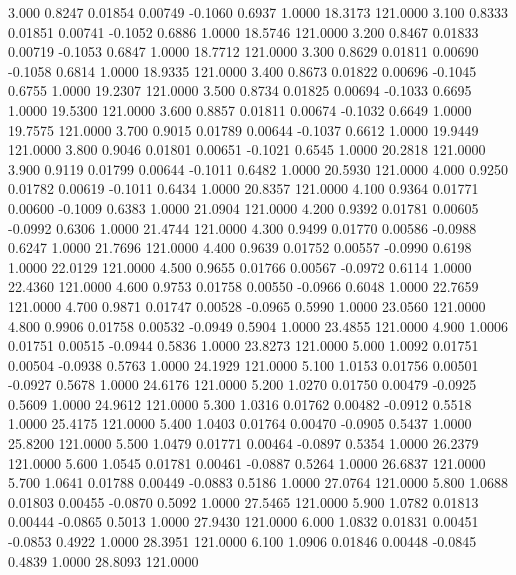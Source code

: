    3.000   0.8247   0.01854   0.00749  -0.1060   0.6937   1.0000  18.3173 121.0000
   3.100   0.8333   0.01851   0.00741  -0.1052   0.6886   1.0000  18.5746 121.0000
   3.200   0.8467   0.01833   0.00719  -0.1053   0.6847   1.0000  18.7712 121.0000
   3.300   0.8629   0.01811   0.00690  -0.1058   0.6814   1.0000  18.9335 121.0000
   3.400   0.8673   0.01822   0.00696  -0.1045   0.6755   1.0000  19.2307 121.0000
   3.500   0.8734   0.01825   0.00694  -0.1033   0.6695   1.0000  19.5300 121.0000
   3.600   0.8857   0.01811   0.00674  -0.1032   0.6649   1.0000  19.7575 121.0000
   3.700   0.9015   0.01789   0.00644  -0.1037   0.6612   1.0000  19.9449 121.0000
   3.800   0.9046   0.01801   0.00651  -0.1021   0.6545   1.0000  20.2818 121.0000
   3.900   0.9119   0.01799   0.00644  -0.1011   0.6482   1.0000  20.5930 121.0000
   4.000   0.9250   0.01782   0.00619  -0.1011   0.6434   1.0000  20.8357 121.0000
   4.100   0.9364   0.01771   0.00600  -0.1009   0.6383   1.0000  21.0904 121.0000
   4.200   0.9392   0.01781   0.00605  -0.0992   0.6306   1.0000  21.4744 121.0000
   4.300   0.9499   0.01770   0.00586  -0.0988   0.6247   1.0000  21.7696 121.0000
   4.400   0.9639   0.01752   0.00557  -0.0990   0.6198   1.0000  22.0129 121.0000
   4.500   0.9655   0.01766   0.00567  -0.0972   0.6114   1.0000  22.4360 121.0000
   4.600   0.9753   0.01758   0.00550  -0.0966   0.6048   1.0000  22.7659 121.0000
   4.700   0.9871   0.01747   0.00528  -0.0965   0.5990   1.0000  23.0560 121.0000
   4.800   0.9906   0.01758   0.00532  -0.0949   0.5904   1.0000  23.4855 121.0000
   4.900   1.0006   0.01751   0.00515  -0.0944   0.5836   1.0000  23.8273 121.0000
   5.000   1.0092   0.01751   0.00504  -0.0938   0.5763   1.0000  24.1929 121.0000
   5.100   1.0153   0.01756   0.00501  -0.0927   0.5678   1.0000  24.6176 121.0000
   5.200   1.0270   0.01750   0.00479  -0.0925   0.5609   1.0000  24.9612 121.0000
   5.300   1.0316   0.01762   0.00482  -0.0912   0.5518   1.0000  25.4175 121.0000
   5.400   1.0403   0.01764   0.00470  -0.0905   0.5437   1.0000  25.8200 121.0000
   5.500   1.0479   0.01771   0.00464  -0.0897   0.5354   1.0000  26.2379 121.0000
   5.600   1.0545   0.01781   0.00461  -0.0887   0.5264   1.0000  26.6837 121.0000
   5.700   1.0641   0.01788   0.00449  -0.0883   0.5186   1.0000  27.0764 121.0000
   5.800   1.0688   0.01803   0.00455  -0.0870   0.5092   1.0000  27.5465 121.0000
   5.900   1.0782   0.01813   0.00444  -0.0865   0.5013   1.0000  27.9430 121.0000
   6.000   1.0832   0.01831   0.00451  -0.0853   0.4922   1.0000  28.3951 121.0000
   6.100   1.0906   0.01846   0.00448  -0.0845   0.4839   1.0000  28.8093 121.0000
